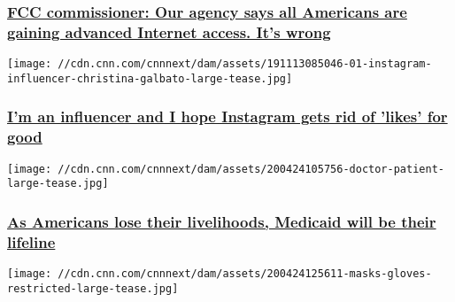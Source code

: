 \hypertarget{fcc-commissioner-our-agency-says-all-americans-are-gaining-advanced-internet-access-its-wrong}{%
\subsubsection{\texorpdfstring{\href{/2020/04/29/perspectives/fcc-broadband-access/index.html}{FCC
commissioner: Our agency says all Americans are gaining advanced
Internet access. It's
wrong}}{FCC commissioner: Our agency says all Americans are gaining advanced Internet access. It's wrong}}\label{fcc-commissioner-our-agency-says-all-americans-are-gaining-advanced-internet-access-its-wrong}}

\href{/2019/11/13/perspectives/instagram-removing-likes/index.html}{}

\texttt{[image: //cdn.cnn.com/cnnnext/dam/assets/191113085046-01-instagram-influencer-christina-galbato-large-tease.jpg]}

\hypertarget{im-an-influencer-and-i-hope-instagram-gets-rid-of-likes-for-good}{%
\subsubsection{\texorpdfstring{\href{/2019/11/13/perspectives/instagram-removing-likes/index.html}{I'm
an influencer and I hope Instagram gets rid of 'likes' for
good}}{I'm an influencer and I hope Instagram gets rid of 'likes' for good}}\label{im-an-influencer-and-i-hope-instagram-gets-rid-of-likes-for-good}}

\href{/2020/04/27/perspectives/medicaid-health-care-coronavirus/index.html}{}

\texttt{[image: //cdn.cnn.com/cnnnext/dam/assets/200424105756-doctor-patient-large-tease.jpg]}

\hypertarget{as-americans-lose-their-livelihoods-medicaid-will-be-their-lifeline}{%
\subsubsection{\texorpdfstring{\href{/2020/04/27/perspectives/medicaid-health-care-coronavirus/index.html}{As
Americans lose their livelihoods, Medicaid will be their
lifeline}}{As Americans lose their livelihoods, Medicaid will be their lifeline}}\label{as-americans-lose-their-livelihoods-medicaid-will-be-their-lifeline}}

\href{/2020/04/24/perspectives/ppe-production-shortage/index.html}{}

\texttt{[image: //cdn.cnn.com/cnnnext/dam/assets/200424125611-masks-gloves-restricted-large-tease.jpg]}

